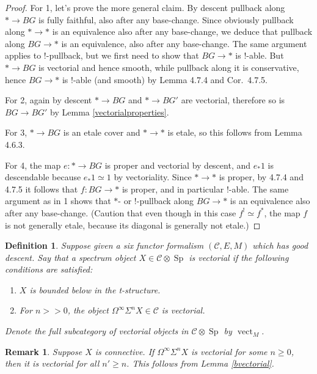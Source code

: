 \documentclass[12pt]{article}
\newtheorem{definition}[theorem]{Definition}
\newtheorem{remark}[theorem]{Remark}
\newcommand{\on}{\operatorname}
\newcommand{\mc}{\mathcal}
\begin{document}
\begin{proof}
For 1, let's prove the more general claim.  By descent pullback along $\ast \to BG$ is fully faithful, also after any base-change.  Since obviously pullback along $\ast \to \ast$ is an equivalence also after any base-change, we deduce that pullback along $BG\to \ast$ is an equivalence, also after any base-change.  The same argument applies to $!$-pullback, but we first need to show that $BG\to \ast$ is $!$-able.  But $\ast \to BG$ is vectorial and hence smooth, while pullback along it is conservative, hence $BG\to \ast$ is $!$-able (and smooth) by \cite{HeyerSixFunctors} Lemma 4.7.4 and Cor.\ 4.7.5.

For 2, again by descent $\ast \to BG$ and $\ast \to BG'$ are vectorial, therefore so is $BG\to BG'$ by Lemma \ref{vectorialproperties}.

For 3, $\ast \to BG$ is an etale cover and $\ast \to \ast$ is etale, so this follows from \cite{HeyerSixFunctors} Lemma 4.6.3.

For 4, the map $e:\ast \to BG$ is proper and vectorial by descent, and $e_\ast 1$ is descendable because $e_\ast 1\simeq 1$ by vectoriality.  Since $\ast \to \ast$ is proper, by \cite{HeyerSixFunctors} 4.7.4 and 4.7.5 it follows that $f:BG\to \ast$ is proper, and in particular $!$-able.  The same argument as in 1 shows that $\ast$- or $!$-pullback along $BG\to \ast$ is an equivalence also after any base-change. (Caution that even though in this case $f^!\simeq f^\ast$, the map $f$ is not generally etale, because its diagonal is generally not etale.) \end{proof}

\begin{definition}
Suppose given a six functor formalism $(\mc{C},E,M)$ which has good descent.  Say that a spectrum object $X\in \mc{C}\otimes\on{Sp}$ is \emph{vectorial} if the following conditions are satisfied:
\begin{enumerate}
\item $X$ is bounded below in the t-structure.
\item For $n>>0$, the object $\Omega^\infty \Sigma^n X \in \mc{C}$ is vectorial.
\end{enumerate}
Denote the full subcategory of vectorial objects in $\mc{C}\otimes\on{Sp}$ by $\on{vect}_M$.
\end{definition}

\begin{remark}
Suppose $X$ is connective.  If $\Omega^\infty \Sigma^nX$ is vectorial for some $n\geq 0$, then it is vectorial for all $n'\geq n$.  This follows from Lemma \ref{bvectorial}.
\end{remark}
\end{document}
